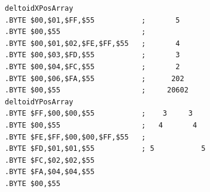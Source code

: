 \begin{minipage}[b]{0.48\linewidth}
\begin{lrbox}{\mybox}%
\begin{lstlisting}[basicstyle=\ttfamily\tiny]
deltoidXPosArray
.BYTE $00,$01,$FF,$55           ;       5      
.BYTE $00,$55                   ;              
.BYTE $00,$01,$02,$FE,$FF,$55   ;       4      
.BYTE $00,$03,$FD,$55           ;       3      
.BYTE $00,$04,$FC,$55           ;       2      
.BYTE $00,$06,$FA,$55           ;      202     
.BYTE $00,$55                   ;     20602    
deltoidYPosArray  
.BYTE $FF,$00,$00,$55           ;    3     3   
.BYTE $00,$55                   ;   4       4  
.BYTE $FE,$FF,$00,$00,$FF,$55   ;              
.BYTE $FD,$01,$01,$55           ; 5           5
.BYTE $FC,$02,$02,$55
.BYTE $FA,$04,$04,$55
.BYTE $00,$55
\end{lstlisting}
\end{lrbox}%
\scalebox{0.8}{\usebox{\mybox}}

\end{minipage}
